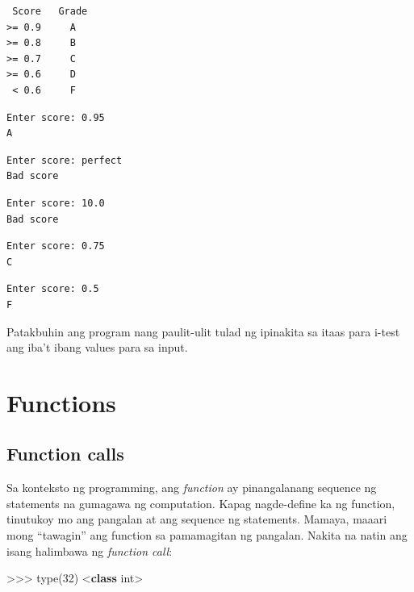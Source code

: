 \documentclass[10pt,]{book}
\newenvironment{Shaded}{}{}
\newcommand{\BuiltInTok}[1]{\textcolor[rgb]{0.00,0.50,0.00}{#1}}
\newcommand{\DecValTok}[1]{\textcolor[rgb]{0.25,0.63,0.44}{#1}}
\newcommand{\KeywordTok}[1]{\textcolor[rgb]{0.00,0.44,0.13}{\textbf{#1}}}
\newcommand{\NormalTok}[1]{#1}
\newcommand{\OperatorTok}[1]{\textcolor[rgb]{0.40,0.40,0.40}{#1}}
\newcommand{\StringTok}[1]{\textcolor[rgb]{0.25,0.44,0.63}{#1}}
\begin{document}
{\small
\begin{verbatim}
 Score   Grade
>= 0.9     A
>= 0.8     B
>= 0.7     C
>= 0.6     D
 < 0.6     F
\end{verbatim}
}

{\small
\begin{verbatim}
Enter score: 0.95
A
\end{verbatim}
}

{\small
\begin{verbatim}
Enter score: perfect
Bad score
\end{verbatim}
}

{\small
\begin{verbatim}
Enter score: 10.0
Bad score
\end{verbatim}
}

{\small
\begin{verbatim}
Enter score: 0.75
C
\end{verbatim}
}

{\small
\begin{verbatim}
Enter score: 0.5
F
\end{verbatim}
}

Patakbuhin ang program nang paulit-ulit tulad ng ipinakita sa itaas para
i-test ang iba't ibang values para sa input.

\chapter{Functions}\label{functions}

\section{Function calls}\label{function-calls}


Sa konteksto ng programming, ang \emph{function} ay pinangalanang
sequence ng statements na gumagawa ng computation. Kapag nagde-define ka
ng function, tinutukoy mo ang pangalan at ang sequence ng statements.
Mamaya, maaari mong ``tawagin'' ang function sa pamamagitan ng pangalan.
Nakita na natin ang isang halimbawa ng \emph{function call}:

\begin{Shaded}
\begin{Highlighting}[]
\OperatorTok{\textgreater{}\textgreater{}\textgreater{}} \BuiltInTok{type}\NormalTok{(}\DecValTok{32}\NormalTok{)}
\OperatorTok{\textless{}}\KeywordTok{class} \StringTok{\textquotesingle{}int\textquotesingle{}}\OperatorTok{\textgreater{}}
\end{Highlighting}
\end{Shaded}
\end{document}
